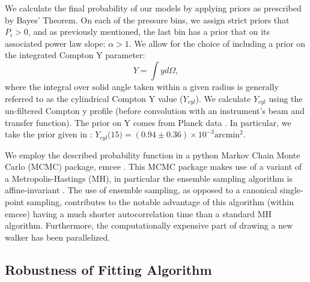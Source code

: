 \documentclass[twocolumn,traditabstract]{aa}
\begin{document}
We calculate the final probability of our models by applying priors as prescribed by Bayes' Theorem.
On each of the pressure bins, we assign strict priors that $P_i > 0$, and as previously mentioned, the last bin
has a prior that on its associated power law slope: $\alpha > 1$. We allow for the choice of including a prior
on the integrated Compton Y parameter:
\begin{equation}
  Y = \int y d\Omega,
  \label{eqn:integrated_y}
\end{equation}
where the integral over solid angle taken within a given radius is generally referred to as the cylindrical
Compton Y value ($Y_{cyl}$). We calculate $Y_{cyl}$ using the un-filtered Compton y profile (before convolution with
an instrument's beam and transfer function). The prior on Y comes
from Planck data \citep{planck2014}. In particular, we take the prior given in \citet{adam2015}:
$Y_{cyl}(15$\amin$) = (0.94 \pm 0.36) \times 10^{-3} \text{arcmin}^2$.

We employ the described probability function in a python Markov Chain Monte Carlo (MCMC) package, emcee \citep{foreman2013}.
This MCMC package makes use of a variant of a Metropolis-Hastings (MH), in particular the ensemble sampling algorithm is
affine-invariant \citep{goodman2010}. The use of ensemble sampling, as opposed to a canonical single-point sampling, contributes
to the notable advantage of this algorithm (within emcee) having a much shorter autocorrelation time than a standard MH algorithm.
Furthermore, the computationally expensive part of drawing a new walker has been parallelized.


\subsection{Robustness of Fitting Algorithm}
\label{sec:robustness}
\end{document}
